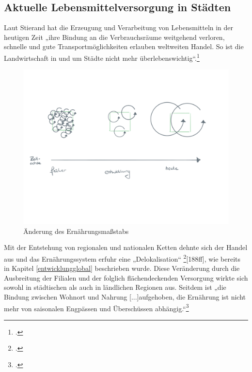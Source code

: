 \documentclass{scrartcl}
\begin{document}
\subsection{Aktuelle Lebensmittelversorgung in Städten}
Laut Stierand hat die Erzeugung und Verarbeitung von Lebensmitteln in der heutigen Zeit „ihre Bindung an die Verbrauchsräume weitgehend verloren, schnelle und gute Transportmöglichkeiten erlauben weltweiten Handel. So ist die Landwirtschaft in und um Städte nicht mehr überlebenswichtig“.\footcite[S.122f]{Stierand2008StadtLebensmittel} 

\begin{figure}[htbp]
\centering
\includegraphics[width=12cm]{image_folder/ernahrung.png}
\caption{Änderung des Ernährungsmaßstabs}
\label{fig:massstab}
\end{figure}

Mit der Entstehung von regionalen und nationalen Ketten dehnte sich der Handel aus und das Ernährungssystem erfuhr eine „Delokalisation“  \footcite{MASSIMOMONTANARI1993DerEuropa}[188ff], wie bereits in Kapitel \ref{entwicklungglobal} beschrieben wurde. Diese Veränderung durch die Ausbreitung der Filialen und der folglich flächendeckenden Versorgung wirkte sich sowohl in städtischen als auch in ländlichen Regionen aus. Seitdem ist „die Bindung zwischen Wohnort und Nahrung [...]aufgehoben, die Ernährung ist nicht mehr von saisonalen Engpässen und Überschüssen abhängig.“\footcite[S.122]{Stierand2008StadtLebensmittel}  
\end{document}
